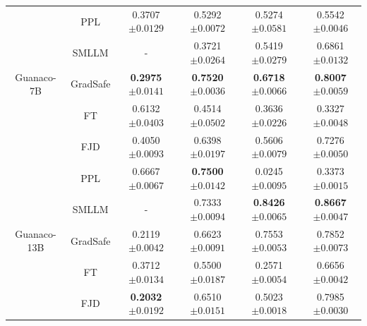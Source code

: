 \documentclass{article}
\begin{document}
\begin{table}[t]
\begin{tabular}{cccccc}
    \midrule
    \multirow{5}{*}{Guanaco-7B} 
    & PPL  & 0.3707\tiny{$\pm 0.0129$} & 0.5292\tiny{$\pm 0.0072$} & 0.5274\tiny{$\pm 0.0581$} & 0.5542\tiny{$\pm 0.0046$} \\
    & SMLLM & - & 0.3721\tiny{$\pm 0.0264$} & 0.5419\tiny{$\pm 0.0279$} & 0.6861\tiny{$\pm 0.0132$} \\
    & GradSafe & \textbf{0.2975}\tiny{$\pm 0.0141$} & \textbf{0.7520}\tiny{$\pm 0.0036$} & \textbf{0.6718}\tiny{$\pm 0.0066$} & \textbf{0.8007}\tiny{$\pm 0.0059$} \\
    & FT & 0.6132\tiny{$\pm 0.0403$} & 0.4514\tiny{$\pm 0.0502$} & 0.3636\tiny{$\pm 0.0226$} & 0.3327\tiny{$\pm 0.0048$} \\
    & FJD & 0.4050\tiny{$\pm 0.0093$} & 0.6398\tiny{$\pm 0.0197$} & 0.5606\tiny{$\pm 0.0079$} & 0.7276\tiny{$\pm 0.0050$} \\
    \midrule
    \multirow{5}{*}{Guanaco-13B} 
    & PPL & 0.6667\tiny{$\pm 0.0067$} & \textbf{0.7500}\tiny{$\pm 0.0142$} & 0.0245\tiny{$\pm 0.0095$} & 0.3373\tiny{$\pm 0.0015$} \\
    & SMLLM & - & 0.7333\tiny{$\pm 0.0094$} & \textbf{0.8426}\tiny{$\pm 0.0065$} & \textbf{0.8667}\tiny{$\pm 0.0047$}\\
    & GradSafe & 0.2119\tiny{$\pm 0.0042$} & 0.6623\tiny{$\pm 0.0091$} & 0.7553\tiny{$\pm 0.0053$} & 0.7852\tiny{$\pm 0.0073$}   \\
    & FT & 0.3712\tiny{$\pm 0.0134$} & 0.5500\tiny{$\pm 0.0187$} & 0.2571\tiny{$\pm 0.0054$} & 0.6656\tiny{$\pm 0.0042$} \\
    & FJD & \textbf{0.2032}\tiny{$\pm 0.0192$} & 0.6510\tiny{$\pm 0.0151$} & 0.5023\tiny{$\pm 0.0018$} & 0.7985\tiny{$\pm 0.0030$}\\
    
    \bottomrule
  \end{tabular}
\end{table}
\end{document}
